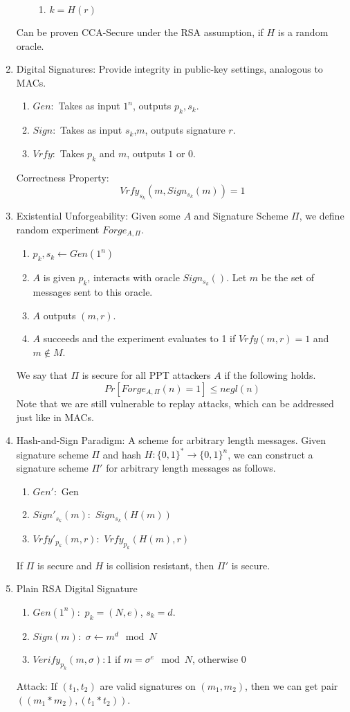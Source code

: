 \documentclass[12pt,letterpaper]{article}
\begin{document}
\begin{enumerate}
\begin{enumerate}
\begin{enumerate}
   					\item $k=H(r)$
   				\end{enumerate}
   		\end{enumerate}
   		 Can be proven CCA-Secure under the RSA assumption, if $H$ is a random oracle.
   		 \item Digital Signatures: Provide integrity in public-key settings, analogous to MACs.
   		 \begin{enumerate}
   		 	\item $Gen:$ Takes as input $1^n$, outputs $p_k,s_k$.
   		 	\item $Sign:$ Takes as input $s_k$,$m$, outputs signature $r$.
   		 	\item $Vrfy:$ Takes $p_k$ and $m$, outputs $1$ or $0$.
   		 \end{enumerate}
   		 Correctness Property:
   		 \[Vrfy_{s_k}(m,Sign_{s_k}(m))=1\]\newpage
   		 \item Existential Unforgeability: Given some $A$ and Signature Scheme $\Pi$, we define random experiment $Forge_{A,\Pi}$.
   		 \begin{enumerate}
   		 	\item $p_k,s_k\leftarrow Gen(1^n)$
   		 	\item $A$ is given $p_k$, interacts with oracle $Sign_{s_k}()$. Let $m$ be the set of messages sent to this oracle.
   		 	\item $A$ outputs $(m,r)$.
   		 	\item $A$ succeeds and the experiment evaluates to 1 if $Vrfy(m,r)=1$ and $m\not\in M$.
   		 \end{enumerate}
   		 We say that $\Pi$ is secure for all PPT attackers $A$ if the following holds.
   		 \[Pr[Forge_{A,\Pi}(n)=1]\leq negl(n)\]
   		 Note that we are still vulnerable to replay attacks, which can be addressed just like in MACs.
   		 \item Hash-and-Sign Paradigm: A scheme for arbitrary length messages. Given signature scheme $\Pi$ and hash $H:\{0,1\}^*\rightarrow\{0,1\}^n$, we can construct a signature scheme $\Pi'$ for arbitrary length messages as follows.
   		 \begin{enumerate}
   		 	\item $Gen':$ Gen
   		 	\item $Sign'_{s_k}(m):$ $Sign_{s_k}(H(m))$
   		 	\item $Vrfy'_{p_k}(m,r):$ $Vrfy_{p_k}(H(m),r)$
   		 \end{enumerate}
   		 If $\Pi$ is secure and $H$ is collision resistant, then $\Pi'$ is secure.
   		 \item Plain RSA Digital Signature
   		 \begin{enumerate}
   		 	\item $Gen(1^n):$ $p_k=(N,e)$, $s_k=d$.
   		 	\item $Sign(m):$ $\sigma\leftarrow m^d\mod N$
   		 	\item $Verify_{p_k}(m,\sigma): $1 if $m=\sigma^e\mod N$, otherwise $0$
   		 \end{enumerate}
   		 Attack: If $(t_1,t_2)$ are valid signatures on $(m_1,m_2)$, then we can get pair $((m_1*m_2),(t_1*t_2))$.
    \end{enumerate}
\end{document}
